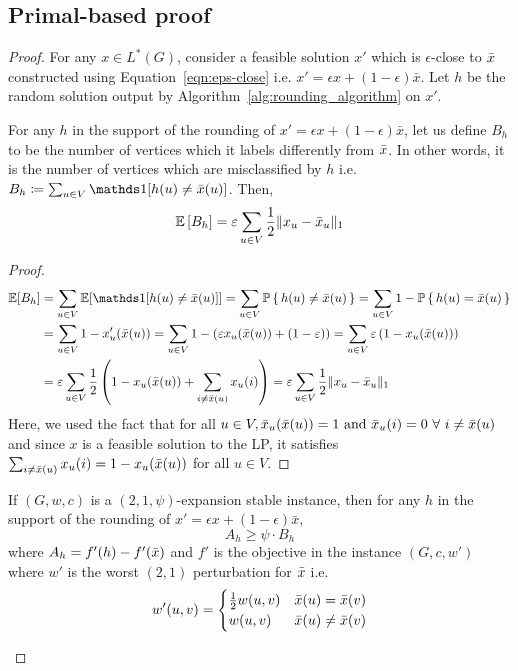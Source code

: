 \subsection{Primal-based proof}
\begin{proof}
For any $x \in L^*(G)$, consider a feasible solution $x'$ which is $\epsilon$-close to $\bar{x}$ constructed using Equation~\ref{eqn:eps-close} i.e. $x' = \epsilon x + (1-\epsilon)\bar{x}$. Let $h$ be the random solution output by Algorithm~\ref{alg:rounding_algorithm} on $x'$.

\begin{lemma}\label{lem:Bh}
For any $h$ in the support of the rounding of $x' = \epsilon x + (1-\epsilon)\bar{x}$, let us define $B_h$ to be the number of vertices which it labels differently from $\bar{x}$. In other words, it is the number of vertices which are misclassified by $h$ i.e. $B_h \coloneqq \sum_{u \in V} \indicator[h(u) \ne \bx(u)]$. Then, 
\[ \operatorname*{\mathbb{E}}{[B_h]} = \varepsilon \sum_{u \in V} \frac{1}{2} \lVert x_u - \bar{x}_u \rVert_1 \]
\end{lemma}
\begin{proof}
\begin{align*}
    \E[B_h] &= \sum_{u \in V} \E[\indicator[h(u) \neq \bx(u)]] = \sum_{u \in V} \prob{h(u) \neq \bx(u)} = \sum_{u \in V} 1 - \prob{h(u) = \bx(u)} 
    \\&= \sum_{u \in V} 1 - x'_u(\bx(u)) = \sum_{u \in V} 1 - \rbr{\epsilon x_u(\bx(u)) + (1-\epsilon)} = \sum_{u \in V} \epsilon \rbr{1 -  x_u(\bx(u))}
    \\&= \epsilon \sum_{u \in V} \frac{1}{2} \rbr{1 - x_u(\bx(u)) + \sum_{i \neq \bx(u)} x_u(i) } = \epsilon \sum_{u \in V} \frac{1}{2} \norm{x_u - \bx_u}_1
\end{align*}
Here, we used the fact that for all $u \in V, \bar{x}_u(\bar{x}(u)) = 1 \text{ and } \bar{x}_u(i) = 0\ \forall\ i \neq \bar{x}(u)$ and since $x$ is a feasible solution to the LP, it satisfies $\sum_{i \ne \bar{x}(u)} x_u(i) = 1 - x_u(\bar{x}(u))$ for all $u \in V$.
\end{proof}

\begin{lemma}\label{lem:Ahlow}
If $(G,w,c)$ is a $(2,1,\psi)$-expansion stable instance, then for any $h$ in the support of the rounding of $x' = \epsilon x + (1-\epsilon)\bar{x}$,
 \[A_h \ge \psi \cdot B_h\]
where $A_h = f'(h) - f'(\bar{x})$ and $f'$ is the objective in the instance $(G,c,w')$ where $w'$ is the worst $(2,1)$ perturbation for $\bar{x}$ i.e. \[
    w'(u,v) = \begin{cases}
    \frac{1}{2}w(u,v) & \bar{x}(u) = 
    \bar{x}(v)\\
    w(u,v) & \bar{x}(u) \ne \bar{x}(v)
\end{cases}
\]
\end{lemma}


\end{proof}
